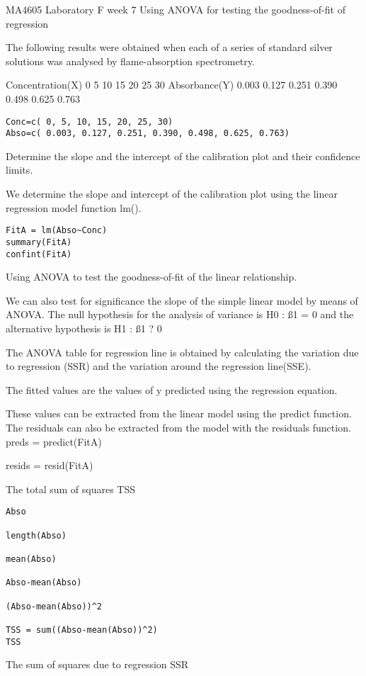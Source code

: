 MA4605 Laboratory F week 7
Using ANOVA for testing the goodness-of-fit of regression

The following results were obtained when each of a series of standard silver solutions was analysed by flame-absorption spectrometry.

Concentration(X)
0
5
10
15
20
25
30
Absorbance(Y)
0.003
0.127
0.251
0.390
0.498
0.625
0.763

\begin{framed}
\begin{verbatim}
Conc=c( 0, 5, 10, 15, 20, 25, 30)
Abso=c( 0.003, 0.127, 0.251, 0.390, 0.498, 0.625, 0.763)
\end{verbatim}
\end{framed}
Determine the slope and the intercept of the calibration plot and their confidence limits.

We determine the slope and intercept of the calibration plot using the linear regression model function lm().

\begin{framed}
\begin{verbatim}
FitA = lm(Abso~Conc)
summary(FitA)
confint(FitA)
\end{verbatim}
\end{framed}

Using ANOVA to test the goodness-of-fit of the linear relationship.

We can also test for significance the slope of the simple linear model by means of ANOVA. The null hypothesis for the analysis of variance is H0 : ß1 = 0 and the alternative hypothesis is H1 : ß1 ? 0

The ANOVA table for regression line is obtained by calculating the variation due to regression (SSR) and the variation around the regression line(SSE).

The fitted  values are the values of y predicted using the regression equation.

These values can be extracted from the linear model using the predict function.
The residuals can also be extracted from the model with the residuals function.
preds = predict(FitA)

resids =  resid(FitA)

The total sum of squares TSS

\begin{framed}
\begin{verbatim}
Abso

length(Abso)

mean(Abso)

Abso-mean(Abso)

(Abso-mean(Abso))^2

TSS = sum((Abso-mean(Abso))^2)
TSS
\end{verbatim}
\end{framed}
The sum of squares due to regression SSR


